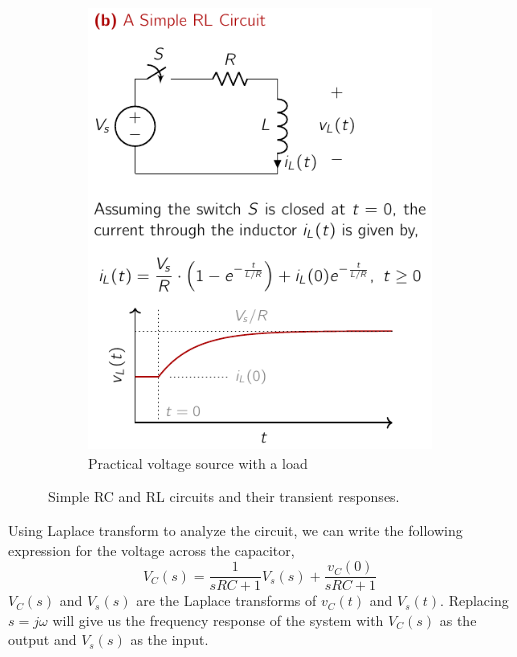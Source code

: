 \begin{figure}[t]
\begin{subfigure}{0.48\textwidth}
        \includegraphics[width=\textwidth]{figure/ch02/fig02-07b.pdf}
        \caption{Practical voltage source with a load}
        \label{fig:02-07b}
    \end{subfigure}
    \caption{Simple RC and RL circuits and their transient responses.}
    \label{fig:02-07}
\end{figure}

Using Laplace transform to analyze the circuit, we can write the following expression for the voltage across the capacitor,
\begin{equation}
    V_C(s) = \frac{1}{sRC + 1} V_s(s) + \frac{v_C(0)}{sRC + 1}
    \label{eq:02-29}
\end{equation}
$V_C(s)$ and $V_s(s)$ are the Laplace transforms of $v_C(t)$ and $V_s(t)$. Replacing $s = j\omega$ will give us the frequency response of the system with $V_C(s)$ as the output and $V_s(s)$ as the input.

